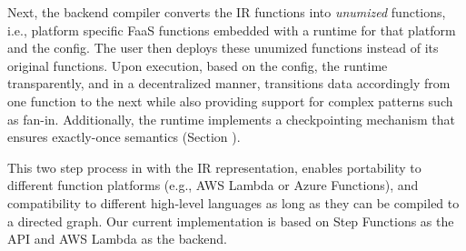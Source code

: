 Next, the \name{} backend compiler converts the IR functions into \textit{unumized} functions, i.e., platform specific FaaS functions embedded with a \name{} runtime for that platform and the \name{} config. The user then deploys these unumized functions instead of its original functions. Upon execution, based on the \name config, the \name{} runtime  transparently, and in a decentralized manner, transitions data accordingly from one function to the next while also providing support for complex patterns such as fan-in. Additionally, the
runtime implements a checkpointing mechanism that ensures exactly-once
semantics (Section ).

This two step process in \name{} with the IR representation, enables portability to different function platforms (e.g., AWS Lambda or Azure Functions), and compatibility to different high-level languages as long as they can be compiled to a directed graph. Our current implementation is based on Step Functions as the API and AWS Lambda as the backend.



 







%






